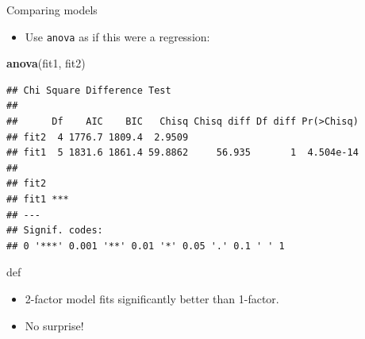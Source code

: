 \documentclass[ignorenonframetext,]{beamer}
\newenvironment{Shaded}{\begin{snugshade}}{\end{snugshade}}
\newcommand{\KeywordTok}[1]{\textcolor[rgb]{0.13,0.29,0.53}{\textbf{#1}}}
\newcommand{\NormalTok}[1]{#1}
\providecommand{\tightlist}{%
  \setlength{\itemsep}{0pt}\setlength{\parskip}{0pt}}
\begin{document}
\begin{frame}[fragile]{Comparing models}
\protect\hypertarget{comparing-models}{}

\begin{itemize}
\tightlist
\item
  Use \texttt{anova} as if this were a regression:
\end{itemize}

\begin{Shaded}
\begin{Highlighting}[]
\KeywordTok{anova}\NormalTok{(fit1, fit2)}
\end{Highlighting}
\end{Shaded}

\begin{verbatim}
## Chi Square Difference Test
## 
##      Df    AIC    BIC   Chisq Chisq diff Df diff Pr(>Chisq)
## fit2  4 1776.7 1809.4  2.9509                              
## fit1  5 1831.6 1861.4 59.8862     56.935       1  4.504e-14
##         
## fit2    
## fit1 ***
## ---
## Signif. codes:  
## 0 '***' 0.001 '**' 0.01 '*' 0.05 '.' 0.1 ' ' 1
\end{verbatim}

def

\begin{itemize}
\item
  2-factor model fits significantly better than 1-factor.
\item
  No surprise!
\end{itemize}

\end{frame}
\end{document}
